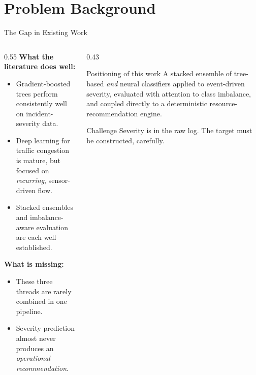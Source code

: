 \section{Problem Background}

\begin{frame}{The Gap in Existing Work}
  \begin{columns}[T]
    \begin{column}{0.55\textwidth}
      \textbf{What the literature does well:}
      \begin{itemize}
        \item Gradient-boosted trees perform consistently well on 
              incident-severity data.
        \item Deep learning for traffic congestion is mature, but focused on
              \emph{recurring}, sensor-driven flow.
        \item Stacked ensembles and imbalance-aware evaluation are each well
              established.
      \end{itemize}
      \vspace{2mm}
      \textbf{What is missing:}
      \begin{itemize}
        \item These three threads are rarely combined in one pipeline.
        \item Severity prediction almost never produces an \emph{operational
              recommendation}.
      \end{itemize}
    \end{column}
    \begin{column}{0.43\textwidth}
      \begin{block}{Positioning of this work}
        A stacked ensemble of tree-based \emph{and} neural classifiers applied to
        event-driven severity, evaluated with  attention to class
        imbalance, and coupled directly to a deterministic
        resource-recommendation engine.
      \end{block}
      \begin{alertblock}{Challenge}
        Severity is  in the raw log. The target
        must be constructed, carefully.
      \end{alertblock}
    \end{column}
  \end{columns}
\end{frame}

